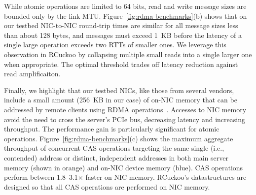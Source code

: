 
While atomic operations are limited to 64 bits, read and write message
sizes are bounded only by the link MTU.
Figure~\ref{fig:rdma-benchmarks}(b) shows that on our testbed
NIC-to-NIC round-trip times are similar for all message sizes
less than about 128 bytes, and
messages must exceed 1~KB before the latency of a single large
operation exceeds two RTTs of smaller ones.  We leverage this
observation in RCuckoo by collapsing multiple small reads into a
single larger one when appropriate.  The optimal threshold trades off
latency reduction against read amplificaiton.


Finally, we highlight that our testbed NICs, like those from several
vendors, include a small amount (256~KB in our case) of on-NIC memory
that can be addressed by remote clients using RDMA
operations~\cite{device-memory}.  Accesses to NIC memory avoid the
need to cross the server's PCIe bus, decreasing latency and increasing
throughput.  The performance gain is particularly significant for
atomic operations.  Figure~\ref{fig:rdma-benchmarks}(c) shows the
maximum aggregate throughput of concurrent CAS operations targeting
the same single (i.e., contended) address or distinct, independent
addresses in both main server memory (shown in orange) and on-NIC
device memory (blue).  CAS operations perform between 1.8--3.1$\times$
faster on NIC memory.  RCuckoo's datastructures are designed so that
all CAS operations are performed on NIC memory.


